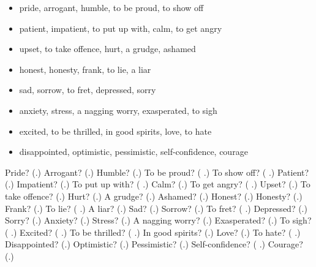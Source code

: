 \begin{itemize}
\raggedright
  \item pride, arrogant, humble, to be proud, to show off
  \item patient, impatient, to put up with, calm, to get angry
  \item upset, to take offence, hurt, a grudge, ashamed
  \item honest, honesty, frank, to lie, a liar
  \item sad, sorrow, to fret, depressed, sorry
  \item anxiety, stress, a nagging worry, exasperated, to sigh
  \item excited, to be thrilled, in good spirits, love, to hate
  \item disappointed, optimistic, pessimistic, self-confidence, courage
\end{itemize}

\begin{tcolorbox}[breakable,colback=teal!4,colframe=teal!35!black,title={Before you move on}]
Pride? (\textbf{}.) Arrogant? (\textbf{}.) Humble? (\textbf{}.) To be proud? (\textbf{ }.) To show off? (\textbf{ }.) Patient? (\textbf{}.) Impatient? (\textbf{}.) To put up with? (\textbf{ }.) Calm? (\textbf{}.) To get angry? (\textbf{ }.) Upset? (\textbf{}.) To take offence? (\textbf{}.) Hurt? (\textbf{}.) A grudge? (\textbf{}.) Ashamed? (\textbf{}.) Honest? (\textbf{}.) Honesty? (\textbf{}.) Frank? (\textbf{}.) To lie? (\textbf{ }.) A liar? (\textbf{}.) Sad? (\textbf{}.) Sorrow? (\textbf{}.) To fret? (\textbf{ }.) Depressed? (\textbf{}.) Sorry? (\textbf{}.) Anxiety? (\textbf{}.) Stress? (\textbf{}.) A nagging worry? (\textbf{}.) Exasperated? (\textbf{}.) To sigh? (\textbf{ }.) Excited? (\textbf{ }.) To be thrilled? (\textbf{ }.) In good spirits? (\textbf{}.) Love? (\textbf{}.) To hate? (\textbf{ }.) Disappointed? (\textbf{}.) Optimistic? (\textbf{}.) Pessimistic? (\textbf{}.) Self-confidence? (\textbf{  }.) Courage? (\textbf{}.)
\end{tcolorbox}
